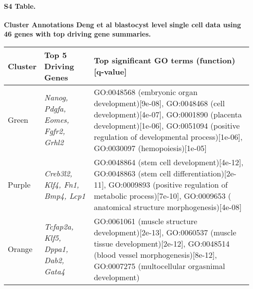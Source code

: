 \documentclass[10pt,letterpaper]{article}
\begin{document}
\paragraph*{S4 Table.}
\label{supptab4}
{\bf Cluster Annotations Deng et al blastocyst level single cell data using 46
genes with top driving gene summaries.}

\begin{table}[!hp]
\begin{adjustwidth}{-2in}{0in}
\begin{tabular}{|p{1.0in}|p{1.0in}|p{5.0in}|}
\hline
Cluster & Top 5 Driving \qquad Genes  &  Top significant GO terms (function)[q-value] \\
\hline
Green &  \textit{Nanog, Pdgfa, Eomes, Fgfr2, Grhl2} & GO:0048568 (embryonic organ development)[9e-08],
GO:0048468 (cell development)[4e-07],  GO:0001890 (placenta development)[1e-06], GO:0051094 (positive
regulation of developmental process)[1e-06],  GO:0030097 (hemopoiesis)[1e-05] \\ \hline
Purple &  \textit{Creb3l2, Klf4, Fn1, Bmp4, Lcp1} &  GO:0048864 (stem cell development)[4e-12], GO:0048863
(stem cell differentiation)[2e-11], GO:0009893 (positive regulation of metabolic process)[7e-10], GO:0009653 (
anatomical structure morphogenesis)[4e-08] \\ \hline
Orange & \textit{Tcfap2a, Klf5, Dppa1, Dab2, Gata4} & GO:0061061 (muscle structure development)[2e-13],
GO:0060537 (muscle tissue development)[2e-12], GO:0048514 (blood vessel morphogenesis)[8e-12], 
GO:0007275 (multocellular orgasnimal development) \\ \hline
\end{tabular}
\end{adjustwidth}
\end{table}
\end{document}
